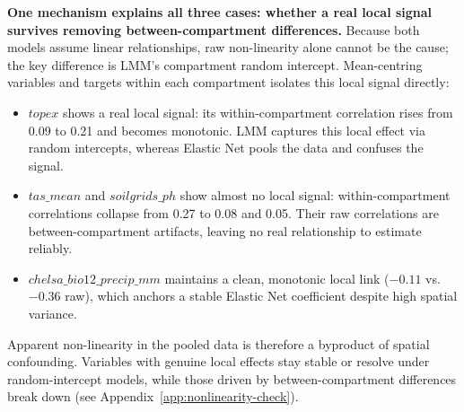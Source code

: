 \documentclass[logo,msc,ai]{infthesis}           %
\begin{document}
\textbf{One mechanism explains all three cases: whether a real local signal survives removing between-compartment differences.} %
Because both models assume linear relationships, raw non-linearity alone cannot be the cause; the key difference is LMM's compartment random intercept. Mean-centring variables and targets within each compartment isolates this local signal directly:

\begin{itemize}
    \item $\mathit{topex}$ shows a real local signal: its within-compartment correlation rises from 0.09 to 0.21 and becomes monotonic. LMM captures this local effect via random intercepts, whereas Elastic Net pools the data and confuses the signal.
    \item $\mathit{tas\_mean}$ and $\mathit{soilgrids\_ph}$ show almost no local signal: within-compartment correlations collapse from 0.27 to 0.08 and 0.05. Their raw correlations are between-compartment artifacts, leaving no real relationship to estimate reliably.
    \item $\mathit{chelsa\_bio12\_precip\_mm}$ maintains a clean, monotonic local link ($-0.11$ vs.\ $-0.36$ raw), which anchors a stable Elastic Net coefficient despite high spatial variance.
\end{itemize}

Apparent non-linearity in the pooled data is therefore a byproduct of spatial confounding. Variables with genuine local effects stay stable or resolve under random-intercept models, while those driven by between-compartment differences break down (see Appendix~\ref{app:nonlinearity-check}).
\end{document}
